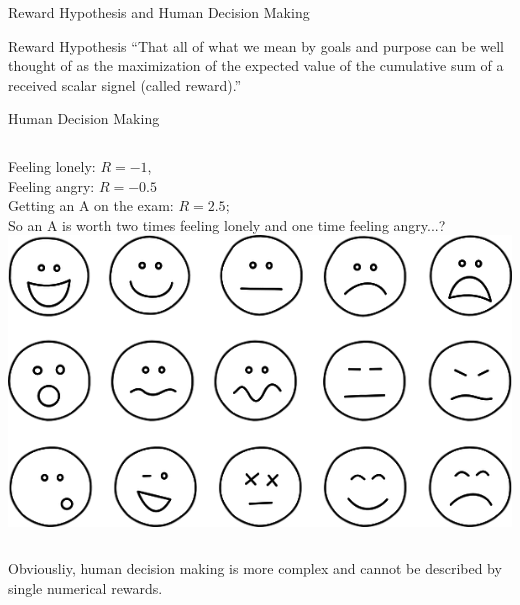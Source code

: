 \documentclass{beamer}
\begin{document}

\begin{frame}{Reward Hypothesis and Human Decision Making}

\begin{alertblock}{Reward Hypothesis}
``That all of what we mean by goals and purpose can be well thought of as the maximization of the expected value of the cumulative sum of a received scalar signel (called reward).''
\end{alertblock}

	\begin{exampleblock}{Human Decision Making}
	\begin{columns}
		Feeling lonely: $R = -1$, \\
		Feeling angry: $R = -0.5$ \\
		Getting an A on the exam: $R = 2.5$; \\
		So an A is worth two times feeling lonely and one time feeling angry...? \\
		\includegraphics[width=\linewidth]{Images/emotions.png}\\
	\end{columns} 
	\end{exampleblock}	

Obviousliy, human decision making is more complex and cannot be described by single numerical rewards. 
\end{frame}

\end{document}
